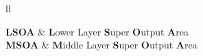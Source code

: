 \begin{abbreviations}{ll} %

\textbf{LSOA} & \textbf{L}ower Layer \textbf{S}uper \textbf{O}utput \textbf{A}rea\\
\textbf{MSOA} & \textbf{M}iddle Layer \textbf{S}uper \textbf{O}utput \textbf{A}rea\\

\end{abbreviations}
